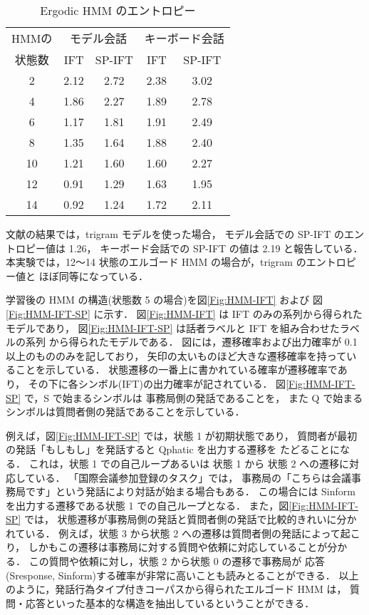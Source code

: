 \begin{table}
\caption{Ergodic HMM のエントロピー}
\label{Tab:HMMEntropy}
\begin{center}
\begin{tabular}{c|cc|cc}
\hline
HMMの   & \multicolumn{2}{c|}{モデル会話}       & \multicolumn{2}{c}{キーボード会話} \\
        \cline{2-3} \cline{4-5}
状態数  & IFT   & SP-IFT        & IFT   & SP-IFT        \\ \hline
2       & 2.12  & 2.72          & 2.38  & 3.02          \\ \hline
4       & 1.86  & 2.27          & 1.89  & 2.78          \\ \hline
6       & 1.17  & 1.81          & 1.91  & 2.49          \\ \hline
8       & 1.35  & 1.64          & 1.88  & 2.40          \\ \hline
10      & 1.21  & 1.60          & 1.60  & 2.27          \\ \hline
12      & 0.91  &  1.29  &  1.63  & 1.95  \\ \hline
14      & 0.92  &  1.24  &  1.72  & 2.11  \\ \hline
\end{tabular}
\end{center}
\end{table}


文献\cite{Nagata94}の結果では，trigram モデルを使った場合，
モデル会話での SP-IFT のエントロピー値は 1.26，
キーボード会話での SP-IFT の値は 2.19 と報告している．
本実験では，12〜14 状態のエルゴード HMM の場合が，trigram のエントロピー値と
ほぼ同等になっている．

学習後の HMM の構造(状態数 5 の場合)を図\ref{Fig:HMM-IFT} および
図\ref{Fig:HMM-IFT-SP} に示す．
図\ref{Fig:HMM-IFT} は IFT のみの系列から得られたモデルであり，
図\ref{Fig:HMM-IFT-SP} は話者ラベルと IFT を組み合わせたラベルの系列
から得られたモデルである．
図には，遷移確率および出力確率が 0.1 以上のもののみを記しており，
矢印の太いものほど大きな遷移確率を持っていることを示している．
状態遷移の一番上に書かれている確率が遷移確率であり，
その下に各シンボル(IFT)の出力確率が記されている．
図\ref{Fig:HMM-IFT-SP} で，S で始まるシンボルは
事務局側の発話であることを，
また Q で始まるシンボルは質問者側の発話であることを示している．

例えば，図\ref{Fig:HMM-IFT-SP} では，状態 1 が初期状態であり，
質問者が最初の発話「もしもし」を発話すると Qphatic を出力する遷移を
たどることになる．
これは，状態 1 での自己ループあるいは
状態 1 から 状態 2 への遷移に対応している．
「国際会議参加登録のタスク」では，
事務局の「こちらは会議事務局です」という発話により対話が始まる場合もある．
この場合には Sinform を出力する遷移である状態 1 での自己ループとなる．
また，図\ref{Fig:HMM-IFT-SP} では，
状態遷移が事務局側の発話と質問者側の発話で比較的きれいに分かれている．
例えば，状態 3 から状態 2 への遷移は質問者側の発話によって起こり，
しかもこの遷移は事務局に対する質問や依頼に対応していることが分かる．
この質問や依頼に対し，状態 2 から状態 0 の遷移で事務局が
応答(Sresponse, Sinform)する確率が非常に高いことも読みとることができる．
以上のように，発話行為タイプ付きコーパスから得られたエルゴード HMM は，
質問・応答といった基本的な構造を抽出しているということができる．


